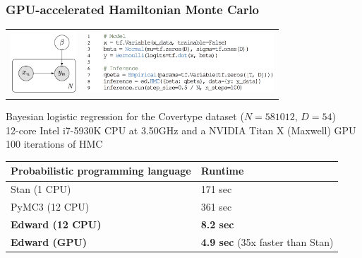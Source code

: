 \documentclass[10pt]{beamer}
\begin{document}
\begin{frame}
\frametitle{GPU-accelerated Hamiltonian Monte Carlo}
\begin{tabular}{cc}
\hspace{-1em}
\includegraphics[width=2.5cm]{img/logistic_graph.png}
&
\includegraphics[width=7cm]{img/logistic_code.png}
\end{tabular}
\vspace{1ex}

Bayesian logistic regression for the Covertype dataset ($N=581012$, $D=54$) \\
12-core Intel i7-5930K CPU at 3.50GHz and a NVIDIA Titan X (Maxwell) GPU \\
100 iterations of HMC
\vspace{1ex}

\begin{table}[tb]
\centering
\begin{tabular}{ll}
\toprule
Probabilistic programming language & Runtime
\\
\midrule
Stan (1 CPU) & 171 sec \\
PyMC3 (12 CPU) & 361 sec \\
\textbf{Edward (12 CPU)} & \textbf{8.2 sec} \\
\textbf{Edward (GPU)} & \textbf{4.9 sec} (35x faster than Stan)\\
\bottomrule
\end{tabular}
\end{table}
\citep{carpenter_stan_2017, salvatier_probabilistic_2015}
\end{frame}
\end{document}
